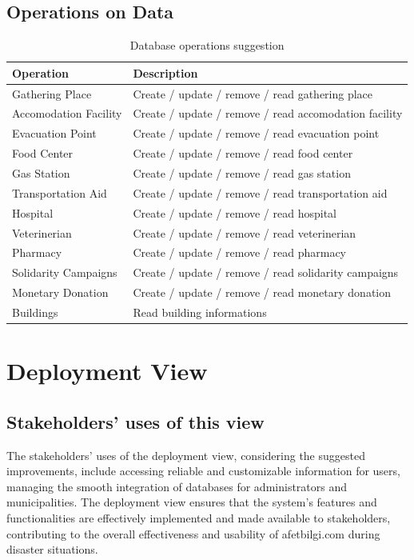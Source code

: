 \documentclass[12pt]{report}
\begin{document}
\subsection{Operations on Data}
\begin{table}[H]
    \centering
    \begin{tabular}{|l|p{10cm}|}
        \hline
    \textbf{Operation}             & \textbf{Description} \\ \hline
    Gathering Place            & Create / update / remove / read gathering place \\ \hline
    Accomodation Facility      & Create / update / remove / read accomodation facility  \\ \hline
    Evacuation Point           & Create / update / remove / read evacuation point \\ \hline
    Food Center                & Create / update / remove / read food center \\ \hline
    Gas Station                & Create / update / remove / read gas station \\ \hline
    Transportation Aid         & Create / update / remove / read transportation aid \\ \hline
    Hospital                   & Create / update / remove / read hospital \\ \hline
    Veterinerian               & Create / update / remove / read veterinerian \\ \hline
    Pharmacy                   & Create / update / remove / read pharmacy \\ \hline
    Solidarity Campaigns       & Create / update / remove / read solidarity campaigns \\ \hline
    Monetary Donation          & Create / update / remove / read monetary donation \\ \hline
    Buildings                  & Read building informations \\ \hline
    \end{tabular}
    \caption{Database operations suggestion}
\end{table}
\section{Deployment View}

\subsection{Stakeholders' uses of this view}
The stakeholders' uses of the deployment view, considering the suggested improvements, include accessing reliable and customizable information for users,
managing the smooth integration of databases for administrators and municipalities. The deployment view ensures that the system's features 
and functionalities are effectively implemented and made available to stakeholders, contributing to the overall effectiveness and usability of afetbilgi.com during disaster situations.
\end{document}

